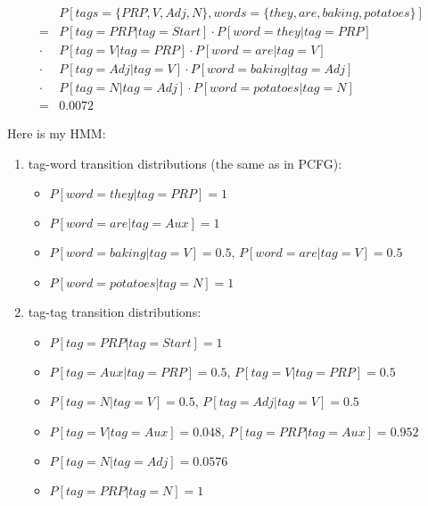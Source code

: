 \documentclass[twoside,11pt]{homework}
\begin{document}
\begin{solution}
  \[
    \begin{aligned}
        &P[tags = \{PRP, V, Adj, N\}, words = \{they, are, baking, potatoes\}]\\
      = &P[tag = PRP | tag = Start] \cdot P[word = they | tag = PRP]\\
      \cdot &P[tag = V | tag = PRP] \cdot P[word = are | tag = V]\\
      \cdot &P[tag = Adj | tag = V] \cdot P[word = baking | tag = Adj]\\
      \cdot &P[tag = N | tag = Adj] \cdot P[word = potatoes | tag = N]\\
      = &0.0072
    \end{aligned}
  \]

  Here is my HMM:
  \begin{enumerate}
  \item tag-word transition distributions (the same as in PCFG):
    \begin{itemize}
    \item $P[word = they | tag = PRP] = 1$
    \item $P[word = are | tag = Aux] = 1$
    \item $P[word = baking | tag = V] = 0.5$, $P[word = are | tag = V] = 0.5$
    \item $P[word = potatoes | tag = N] = 1$
    \end{itemize}
  \item tag-tag transition distributions:
    \begin{itemize}
    \item $P[tag = PRP | tag = Start] = 1$
    \item $P[tag = Aux | tag = PRP] = 0.5$, $P[tag = V | tag = PRP] = 0.5$
    \item $P[tag = N | tag = V] = 0.5$, $P[tag = Adj | tag = V] = 0.5$
    \item $P[tag = V | tag = Aux] = 0.048$, $P[tag = PRP | tag = Aux] = 0.952$
    \item $P[tag = N | tag = Adj] = 0.0576$
    \item $P[tag = PRP | tag = N] = 1$
    \end{itemize}
  \end{enumerate}

\end{solution}
\end{document}
